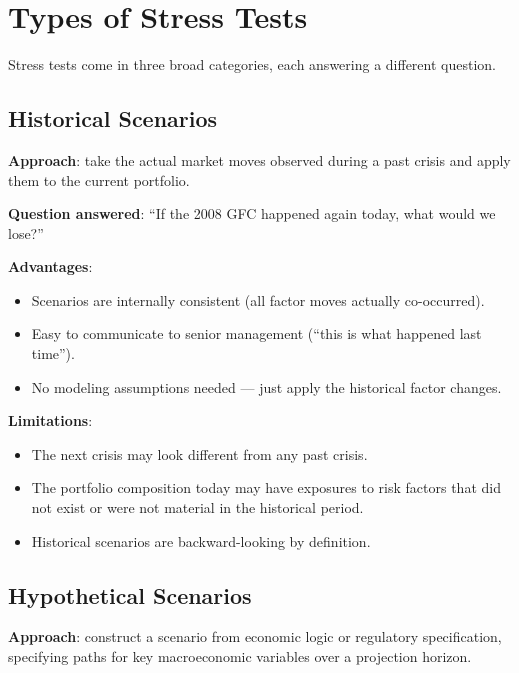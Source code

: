 \documentclass[11pt, a4paper]{article}
\theoremstyle{definition}
\theoremstyle{plain}
\theoremstyle{remark}
\begin{document}
\section{Types of Stress Tests}
\label{sec:types}

Stress tests come in three broad categories, each answering a different question.

\subsection{Historical Scenarios}

\textbf{Approach}: take the actual market moves observed during a past crisis
and apply them to the current portfolio.

\textbf{Question answered}: ``If the 2008 GFC happened again today, what would we lose?''

\textbf{Advantages}:
\begin{itemize}
    \item Scenarios are internally consistent (all factor moves actually co-occurred).
    \item Easy to communicate to senior management (``this is what happened last time'').
    \item No modeling assumptions needed --- just apply the historical factor changes.
\end{itemize}

\textbf{Limitations}:
\begin{itemize}
    \item The next crisis may look different from any past crisis.
    \item The portfolio composition today may have exposures to risk factors
          that did not exist or were not material in the historical period.
    \item Historical scenarios are backward-looking by definition.
\end{itemize}

\subsection{Hypothetical Scenarios}

\textbf{Approach}: construct a scenario from economic logic or regulatory specification,
specifying paths for key macroeconomic variables over a projection horizon.
\end{document}
